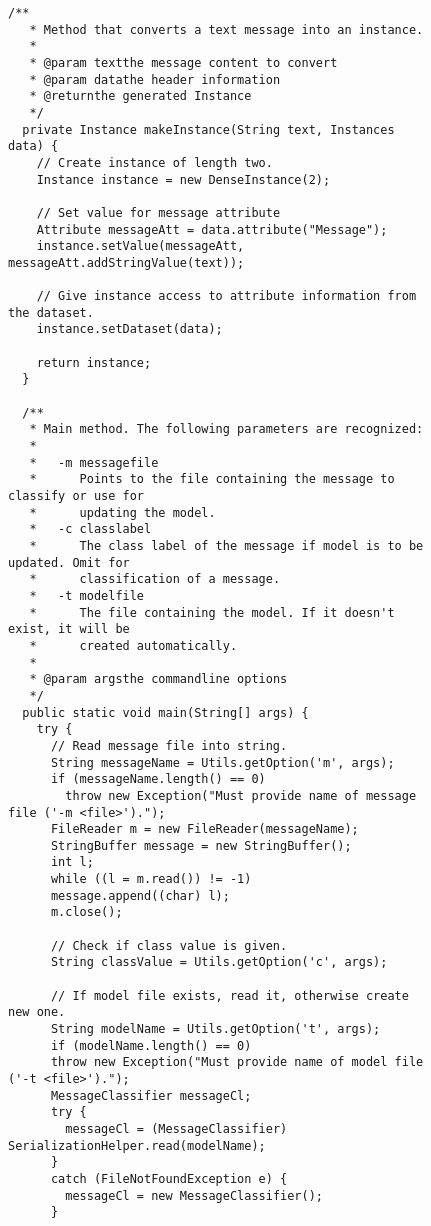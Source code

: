 \begin{figure}[!thp]
\ContinuedFloat
\begin{mdframed}[innermargin=-1cm]
\begin{Verbatim}[fontsize=\scriptsize]
  /**
   * Method that converts a text message into an instance.
   *
   * @param textthe message content to convert
   * @param datathe header information
   * @returnthe generated Instance
   */
  private Instance makeInstance(String text, Instances data) {
    // Create instance of length two.
    Instance instance = new DenseInstance(2);

    // Set value for message attribute
    Attribute messageAtt = data.attribute("Message");
    instance.setValue(messageAtt, messageAtt.addStringValue(text));

    // Give instance access to attribute information from the dataset.
    instance.setDataset(data);

    return instance;
  }

  /**
   * Main method. The following parameters are recognized:
   *
   *   -m messagefile
   *      Points to the file containing the message to classify or use for
   *      updating the model.
   *   -c classlabel
   *      The class label of the message if model is to be updated. Omit for
   *      classification of a message.
   *   -t modelfile
   *      The file containing the model. If it doesn't exist, it will be
   *      created automatically.
   *
   * @param argsthe commandline options
   */
  public static void main(String[] args) {
    try {
      // Read message file into string.
      String messageName = Utils.getOption('m', args);
      if (messageName.length() == 0)
        throw new Exception("Must provide name of message file ('-m <file>').");
      FileReader m = new FileReader(messageName);
      StringBuffer message = new StringBuffer();
      int l;
      while ((l = m.read()) != -1)
      message.append((char) l);
      m.close();

      // Check if class value is given.
      String classValue = Utils.getOption('c', args);

      // If model file exists, read it, otherwise create new one.
      String modelName = Utils.getOption('t', args);
      if (modelName.length() == 0)
      throw new Exception("Must provide name of model file ('-t <file>').");
      MessageClassifier messageCl;
      try {
        messageCl = (MessageClassifier) SerializationHelper.read(modelName);
      }
      catch (FileNotFoundException e) {
        messageCl = new MessageClassifier();
      }


\end{Verbatim}
\end{mdframed}
\end{figure}
